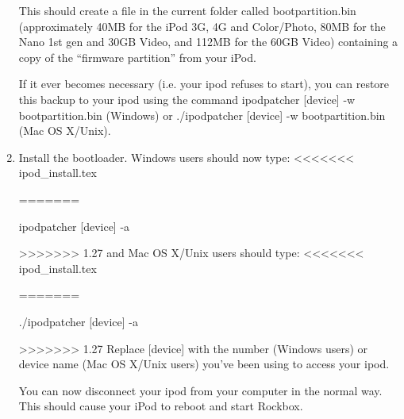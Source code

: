 \begin{enumerate}
    This should create a file in the current folder called bootpartition.bin 
    (approximately 40MB for the iPod 3G, 4G and Color/Photo, 80MB for the Nano 
    1st gen and 30GB Video, and 112MB for the 60GB Video) containing a copy of 
    the ``firmware partition'' from your iPod.

    If it ever becomes necessary (i.e. your ipod refuses to start), you can 
    restore this backup to your ipod using the command ipodpatcher [device] -w 
    bootpartition.bin (Windows) or ./ipodpatcher [device] -w bootpartition.bin 
    (Mac OS X/Unix).   

 
  \item Install the bootloader.
    Windows users should now type:
<<<<<<< ipod_install.tex
      \begin{code}
      \end{code}
    
=======
    \begin{code}
    ipodpatcher [device] -a \bootloaderfile
    \end{code}
>>>>>>> 1.27
    and Mac OS X/Unix users should type:
<<<<<<< ipod_install.tex
      \begin{code}
      \end{code}
    
=======
    \begin{code}
    ./ipodpatcher [device] -a \bootloaderfile
    \end{code}

>>>>>>> 1.27
  Replace [device] with the number (Windows users) or device name (Mac OS X/Unix 
  users) you've been using to access your ipod.  
  
  You can now disconnect your ipod from your computer in the normal way. This 
  should cause your iPod to reboot and start Rockbox.
  
\end{enumerate} 
